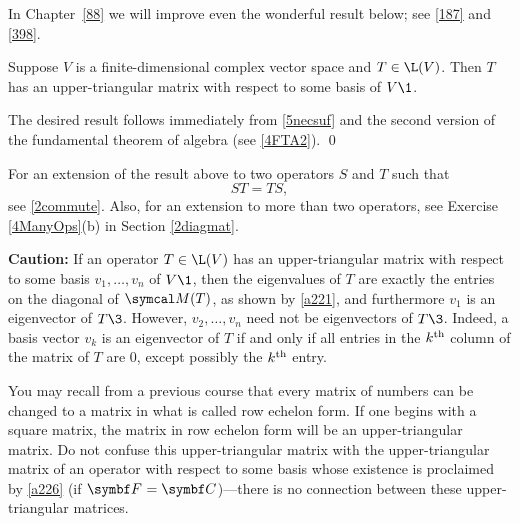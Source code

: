 In Chapter~\ref{88} we will improve even the wonderful result below; see \ref{187} and \ref{398}.

{Suppose $V$ is a finite-dimensional complex vector space and $T \in \L(V)$. Then $T$ has an upper-triangular matrix with respect to some basis of $V\1$.}

\proof
The desired result follows immediately from \ref{5necsuf} and the second version of the fundamental theorem of algebra (see \ref{4FTA2}).
\qed




For an extension of the result above to two operators $S$ and $T$ such that
\[
ST = TS,
\]
see \ref{2commute}. Also, for an extension to more than two operators, see Exercise \ref{4ManyOps}(b) in Section \ref{2diagmat}.

\textbf{Caution:} If an operator $T\in\L(V)$ has an upper-triangular matrix with respect to some basis $v_1, \ldots, v_n$ of $V\1$, then the eigenvalues of $T$ are exactly the entries on the diagonal of $\M(T)$, as shown by \ref{a221}, and furthermore $v_1$ is an eigenvector of $T\3$. However, $v_2, \ldots, v_n$ need not be eigenvectors of $T\3$. Indeed, a basis vector $v_k$ is an eigenvector of $T$ if and only if all  entries in the $k^{\text{{th}}}$ column of the matrix of $T$ are $0$, except possibly the $k^{\text{{th}}}$ entry.


You may recall from a previous course that every matrix of numbers can be changed to a matrix in what is called row echelon form. If one begins with a square matrix, the matrix in row echelon form will be an upper-triangular matrix.
Do not confuse this upper-triangular matrix with the upper-triangular matrix of an operator with respect to some basis whose existence is proclaimed by \ref{a226} (if $\F{} = \C{}$)---there is no connection between these upper-triangular matrices.

